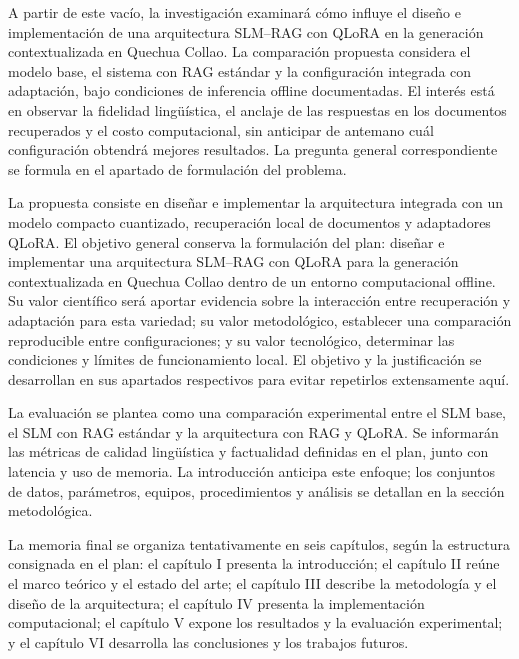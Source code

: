 A partir de este vacío, la investigación examinará cómo influye el diseño e implementación de una arquitectura SLM--RAG con QLoRA en la generación contextualizada en Quechua Collao. La comparación propuesta considera el modelo base, el sistema con RAG estándar y la configuración integrada con adaptación, bajo condiciones de inferencia offline documentadas. El interés está en observar la fidelidad lingüística, el anclaje de las respuestas en los documentos recuperados y el costo computacional, sin anticipar de antemano cuál configuración obtendrá mejores resultados. La pregunta general correspondiente se formula en el apartado de formulación del problema.

La propuesta consiste en diseñar e implementar la arquitectura integrada con un modelo compacto cuantizado, recuperación local de documentos y adaptadores QLoRA. El objetivo general conserva la formulación del plan: diseñar e implementar una arquitectura SLM--RAG con QLoRA para la generación contextualizada en Quechua Collao dentro de un entorno computacional offline. Su valor científico será aportar evidencia sobre la interacción entre recuperación y adaptación para esta variedad; su valor metodológico, establecer una comparación reproducible entre configuraciones; y su valor tecnológico, determinar las condiciones y límites de funcionamiento local. El objetivo y la justificación se desarrollan en sus apartados respectivos para evitar repetirlos extensamente aquí.

La evaluación se plantea como una comparación experimental entre el SLM base, el SLM con RAG estándar y la arquitectura con RAG y QLoRA. Se informarán las métricas de calidad lingüística y factualidad definidas en el plan, junto con latencia y uso de memoria. La introducción anticipa este enfoque; los conjuntos de datos, parámetros, equipos, procedimientos y análisis se detallan en la sección metodológica.

La memoria final se organiza tentativamente en seis capítulos, según la estructura consignada en el plan: el capítulo I presenta la introducción; el capítulo II reúne el marco teórico y el estado del arte; el capítulo III describe la metodología y el diseño de la arquitectura; el capítulo IV presenta la implementación computacional; el capítulo V expone los resultados y la evaluación experimental; y el capítulo VI desarrolla las conclusiones y los trabajos futuros.
